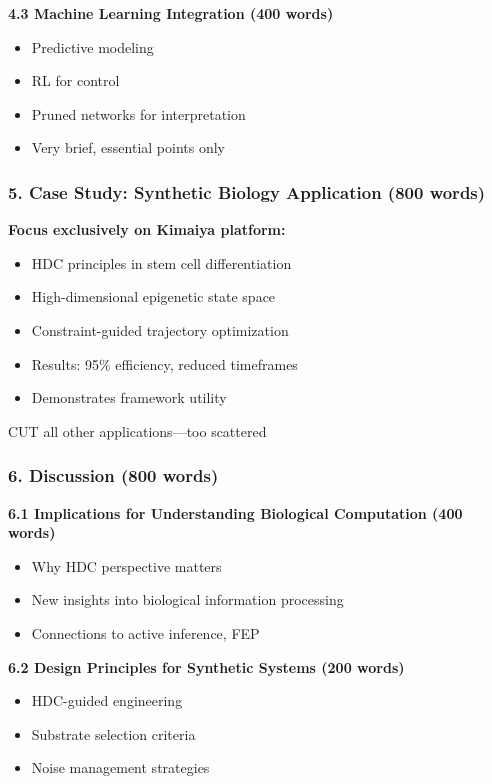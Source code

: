 \documentclass[11pt]{article}
\begin{document}
\textbf{4.3 Machine Learning Integration (400 words)}
\begin{itemize}
    \item Predictive modeling
    \item RL for control
    \item Pruned networks for interpretation
    \item \textcolor{compress}{Very brief, essential points only}
\end{itemize}

\subsubsection{5. Case Study: Synthetic Biology Application (800 words)}

\textbf{Focus exclusively on Kimaiya platform:}
\begin{itemize}
    \item HDC principles in stem cell differentiation
    \item High-dimensional epigenetic state space
    \item Constraint-guided trajectory optimization
    \item Results: 95\% efficiency, reduced timeframes
    \item Demonstrates framework utility
\end{itemize}

\textcolor{cut}{CUT all other applications—too scattered}

\subsubsection{6. Discussion (800 words)}

\textbf{6.1 Implications for Understanding Biological Computation (400 words)}
\begin{itemize}
    \item Why HDC perspective matters
    \item New insights into biological information processing
    \item Connections to active inference, FEP
\end{itemize}

\textbf{6.2 Design Principles for Synthetic Systems (200 words)}
\begin{itemize}
    \item HDC-guided engineering
    \item Substrate selection criteria
    \item Noise management strategies
\end{itemize}
\end{document}
